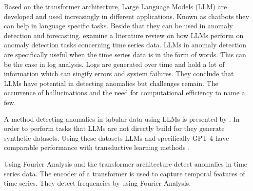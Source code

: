 




Based on the transformer architecture, Large Language Models (LLM) are developed and used increasingly in different applications. Known as chatbots they can help in language specific tasks. Beside that they can be used in anomaly detection and forecasting.  examine a literature review on how LLMs perform on anomaly detection tasks concerning time series data. LLMs in anomaly detection are specifically useful when the time series data is in the form of words. This can be the case in log analysis. Logs are generated over time and hold a lot of information which can singify errors and system failures. They conclude that LLMs have potential in detecting anomalies but challenges remain. The occurrence of hallucinations and the need for computational efficiency to name a few.

A method detecting anomalies in tabular data using LLMs is presented by . In order to perform tasks that LLMs are not directly build for they generate synthetic datasets. Using these datasets LLMs and specifically GPT-4 have comparable performance with transductive learning methods .

Using Fourier Analysis and the transformer architecture  detect anomalies in time series data. The encoder of a transformer is used to capture temporal features of time series. They detect frequencies by using Fourier Analysis.

